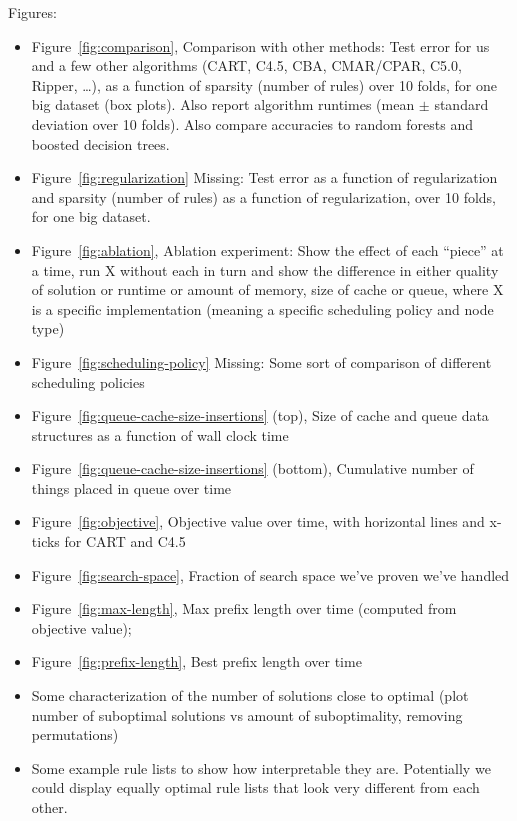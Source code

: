 Figures:
\begin{itemize}

\item Figure~\ref{fig:comparison}, Comparison with other methods:
Test error for us and a few other algorithms
(CART, C4.5, CBA, CMAR/CPAR, C5.0, Ripper, \dots),
as a function of sparsity (number of rules) over 10 folds, for one big dataset (box plots).
Also report algorithm runtimes (mean $\pm$ standard deviation over 10 folds).
Also compare accuracies to random forests and boosted decision trees.

\item Figure~\ref{fig:regularization}
Missing:  Test error as a function of regularization and sparsity
(number of rules) as a function of regularization, over 10 folds,
for one big dataset.

\item Figure~\ref{fig:ablation},  Ablation experiment:
Show the effect of each ``piece'' at a time,
run X without each in turn and show the difference in either
quality of solution or runtime or amount of memory, size of cache or queue,
where X is a specific implementation
(meaning a specific scheduling policy and node type)

\item Figure~\ref{fig:scheduling-policy}
Missing:  Some sort of comparison of different scheduling policies

\item Figure~\ref{fig:queue-cache-size-insertions} (top),
Size of cache and queue data structures as a function of wall clock time

\item Figure~\ref{fig:queue-cache-size-insertions} (bottom),
Cumulative number of things placed in queue over time

\item Figure~\ref{fig:objective}, Objective value over time,
with horizontal lines and x-ticks for CART and C4.5

\item Figure~\ref{fig:search-space},
Fraction of search space we've proven we've handled

\item Figure~\ref{fig:max-length},
Max prefix length over time (computed from objective value);

\item Figure~\ref{fig:prefix-length},
Best prefix length over time

\item Some characterization of the number of solutions close to optimal
(plot number of suboptimal solutions vs amount of suboptimality,
removing permutations)

\item Some example rule lists to show how interpretable they are.
Potentially we could display equally optimal rule lists that look
very different from each other.

\end{itemize}

